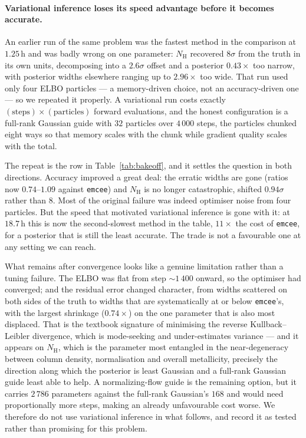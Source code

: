 \documentclass[11pt,a4paper]{article}
\newcommand{\nh}{N_{\mathrm{H}}}
\newcommand{\code}[1]{\texttt{#1}}
\begin{document}
\paragraph{Variational inference loses its speed advantage before it becomes
accurate.} An earlier run of the same problem was the fastest method in the
comparison at $1.25\,$h and was badly wrong on one parameter: $\nh$ recovered
$8\sigma$ from the truth in its own units, decomposing into a $2.6\sigma$ offset
and a posterior $0.43\times$ too narrow, with posterior widths elsewhere ranging
up to $2.96\times$ too wide. That run used only four ELBO particles --- a
memory-driven choice, not an accuracy-driven one --- so we repeated it properly.
A variational run costs exactly $(\text{steps})\times(\text{particles})$ forward
evaluations, and the honest configuration is a full-rank Gaussian guide with $32$
particles over $4\,000$ steps, the particles chunked eight ways so that memory
scales with the chunk while gradient quality scales with the total.

The repeat is the row in Table~\ref{tab:bakeoff}, and it settles the question in
both directions. Accuracy improved a great deal: the erratic widths are gone
(ratios now $0.74$--$1.09$ against \code{emcee}) and $\nh$ is no longer
catastrophic, shifted $0.94\sigma$ rather than $8$. Most of the original failure
was indeed optimiser noise from four particles. But the speed that motivated
variational inference is gone with it: at $18.7\,$h this is now the second-slowest
method in the table, $11\times$ the cost of \code{emcee}, for a posterior that is
still the least accurate. The trade is not a favourable one at any setting we can
reach.

What remains after convergence looks like a genuine limitation rather than a
tuning failure. The ELBO was flat from step ${\sim}1\,400$ onward, so the
optimiser had converged; and the residual error changed character, from widths
scattered on both sides of the truth to widths that are systematically at or
below \code{emcee}'s, with the largest shrinkage ($0.74\times$) on the one
parameter that is also most displaced. That is the textbook signature of
minimising the reverse Kullback--Leibler divergence, which is mode-seeking and
under-estimates variance --- and it appears on $\nh$, which is the parameter
most entangled in the near-degeneracy between column density, normalisation and
overall metallicity, precisely the direction along which the posterior is least
Gaussian and a full-rank Gaussian guide least able to help. A
normalizing-flow guide is the remaining option, but it carries $2\,786$
parameters against the full-rank Gaussian's $168$ and would need proportionally
more steps, making an already unfavourable cost worse. We therefore do not use
variational inference in what follows, and record it as tested rather than
promising for this problem.
\end{document}
